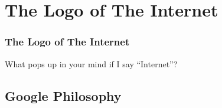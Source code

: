 \documentclass[hyperref={xetex,colorlinks,linkcolor=blue},green,compress]{beamer}
\begin{document}







\section[Google]{The Logo of The Internet}
\label{sec:google}


\begin{frame}\frametitle{The Logo of The Internet}
What pops up in your mind if I say ``Internet''?
\end{frame}

\subsection[Why Google?]{Google Philosophy}
\label{sec:why}
\end{document}
